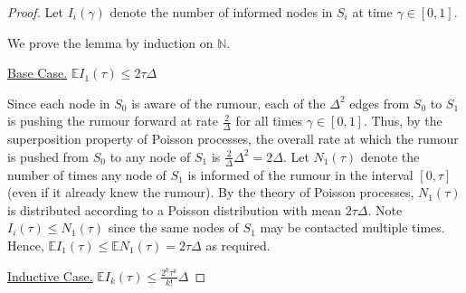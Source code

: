 \begin{proof}
	Let $I_i(\gamma)$ denote the number of informed nodes in $S_i$ at time $\gamma \in [0,1]$. 

	We prove the lemma by induction on $\mathbb{N}$.

	\underline{Base Case.} $\mathbb{E}I_1(\tau) \leq 2 \tau \Delta$

	Since each node in $S_0$ is aware of the rumour, each of the $\Delta^2$ edges from $S_0$ to $S_1$ is pushing the rumour forward at rate $\frac{2}{\Delta}$ for all times $\gamma \in [0,1]$. Thus, by the superposition property of Poisson processes, the overall rate at which the rumour is pushed from $S_0$ to any node of $S_1$ is $\frac{2}{\Delta}\Delta^2 = 2\Delta$. Let $N_1(\tau)$ denote the number of times any node of $S_1$ is informed of the rumour in the interval $[0,\tau]$ (even if it already knew the rumour). By the theory of Poisson processes, $N_1(\tau)$ is distributed according to a Poisson distribution with mean $2\tau\Delta$. Note $I_i(\tau) \leq N_1(\tau)$ since the same nodes of $S_1$ may be contacted multiple times. Hence, $\mathbb{E}I_1(\tau) \leq \mathbb{E}N_1(\tau) = 2\tau\Delta$ as required.
	
	\underline{Inductive Case.} $\mathbb{E}I_k(\tau) \leq \frac{2^k \tau^k}{k!}\Delta$


\end{proof}
